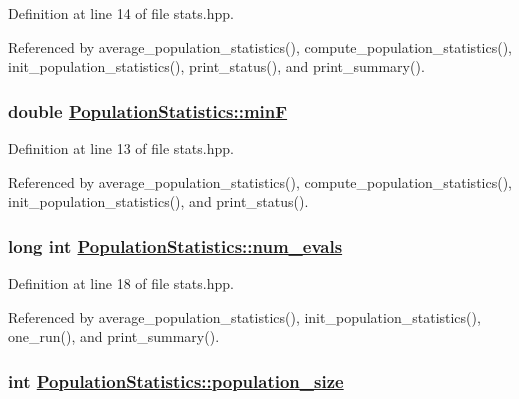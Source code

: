 Definition at line 14 of file stats.hpp.

Referenced by average\_\-population\_\-statistics(), compute\_\-population\_\-statistics(), init\_\-population\_\-statistics(), print\_\-status(), and print\_\-summary().\hypertarget{struct_population_statistics_920d3ac10405c9d918decde3aba6f454}{
\subsubsection[minF]{\setlength{\rightskip}{0pt plus 5cm}double \hyperlink{struct_population_statistics_920d3ac10405c9d918decde3aba6f454}{Population\-Statistics::min\-F}}}
\label{struct_population_statistics_920d3ac10405c9d918decde3aba6f454}




Definition at line 13 of file stats.hpp.

Referenced by average\_\-population\_\-statistics(), compute\_\-population\_\-statistics(), init\_\-population\_\-statistics(), and print\_\-status().\hypertarget{struct_population_statistics_e8cbb263884a6ad09eab3732d22b2b6d}{
\subsubsection[num\_\-evals]{\setlength{\rightskip}{0pt plus 5cm}long int \hyperlink{struct_population_statistics_e8cbb263884a6ad09eab3732d22b2b6d}{Population\-Statistics::num\_\-evals}}}
\label{struct_population_statistics_e8cbb263884a6ad09eab3732d22b2b6d}




Definition at line 18 of file stats.hpp.

Referenced by average\_\-population\_\-statistics(), init\_\-population\_\-statistics(), one\_\-run(), and print\_\-summary().\hypertarget{struct_population_statistics_f5c520ade3e08bca692219445933b6b3}{
\subsubsection[population\_\-size]{\setlength{\rightskip}{0pt plus 5cm}int \hyperlink{struct_population_statistics_f5c520ade3e08bca692219445933b6b3}{Population\-Statistics::population\_\-size}}}
\label{struct_population_statistics_f5c520ade3e08bca692219445933b6b3}




